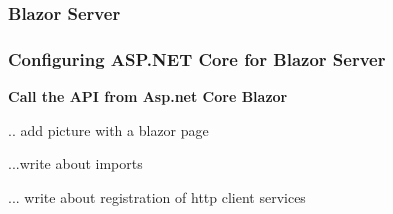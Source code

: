 \documentclass{scrartcl}
\begin{document}
\subsubsection{Blazor Server}
\subsubsection{Configuring ASP.NET Core for Blazor Server}

\textbf{Call the API from Asp.net Core Blazor}

.. add picture with a blazor page

...write about imports 

... write about registration of http client services 

\noindent                                                                
\begin{minipage}{\linewidth}                           
\label{visina8                                                      }
\end{minipage}
\end{document}
